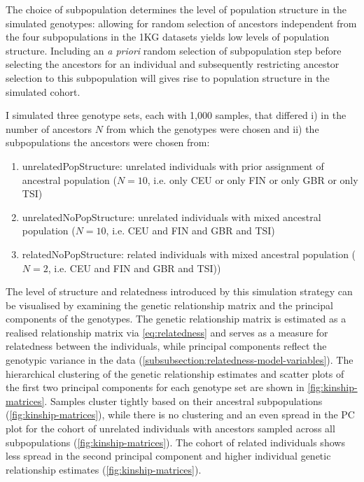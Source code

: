 The choice of subpopulation determines the level of population structure in the simulated genotypes: allowing for random selection of ancestors independent from the four subpopulations in the 1KG datasets yields low levels of population structure. Including an \textit{a priori} random selection of subpopulation step before selecting the ancestors for an individual and subsequently restricting ancestor selection to this subpopulation will gives rise to population structure in the simulated cohort. 

I simulated three genotype sets, each with 1,000 samples, that differed i) in the number of ancestors \(N\) from which the genotypes were chosen and ii) the subpopulations the ancestors were chosen from:
\begin{enumerate}[label=\Alph*.]
\item unrelatedPopStructure: unrelated individuals with prior assignment of ancestral population  (\(N=10\), i.e. only CEU or only FIN or only GBR or only TSI)
\item unrelatedNoPopStructure: unrelated individuals with mixed ancestral population  (\(N=10\), i.e. CEU and FIN and GBR and TSI)
\item relatedNoPopStructure: related individuals with mixed ancestral population (\(N=2\), i.e. CEU and FIN and GBR and TSI))
\end{enumerate}


The level of structure and relatedness introduced by this simulation strategy can be visualised by examining the genetic relationship matrix and the principal components of the genotypes. The genetic relationship matrix is estimated as a realised relationship matrix via \cref{eq:relatedness} and serves as a measure for relatedness between the individuals, while principal components reflect the genotypic variance in the data (\cref{subsubsection:relatedness-model-variables}). The hierarchical clustering of the genetic relationship estimates and scatter plots of the first two principal components for each genotype set are shown in \cref{fig:kinship-matrices}. Samples cluster tightly based on their ancestral subpopulations (\cref{fig:kinship-matrices}), while there is no clustering and an even spread in the PC plot for the cohort of unrelated individuals with ancestors sampled across all subpopulations (\cref{fig:kinship-matrices}). The cohort of related individuals shows less spread in the second principal component and higher individual genetic relationship  estimates (\cref{fig:kinship-matrices}).


